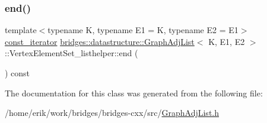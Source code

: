 \mbox{\label{classbridges_1_1datastructure_1_1_graph_adj_list_1_1_vertex_element_set__listhelper_ade98a69d94c58ec30a24f0ed802fe672}} 
\subsubsection{\texorpdfstring{end()}{end()}\hspace{0.1cm}{\footnotesize\ttfamily [2/2]}}
{\footnotesize\ttfamily template$<$typename K, typename E1 = K, typename E2 = E1$>$ \\
\hyperlink{classbridges_1_1datastructure_1_1_graph_adj_list_1_1_vertex_element_set__listhelper_1_1const__iterator}{const\+\_\+iterator} \hyperlink{classbridges_1_1datastructure_1_1_graph_adj_list}{bridges\+::datastructure\+::\+Graph\+Adj\+List}$<$ K, E1, E2 $>$\+::Vertex\+Element\+Set\+\_\+listhelper\+::end (\begin{DoxyParamCaption}{ }\end{DoxyParamCaption}) const\hspace{0.3cm}{\ttfamily [inline]}}



The documentation for this class was generated from the following file\+:\begin{DoxyCompactItemize}
\item 
/home/erik/work/bridges/bridges-\/cxx/src/\hyperlink{_graph_adj_list_8h}{Graph\+Adj\+List.\+h}\end{DoxyCompactItemize}
